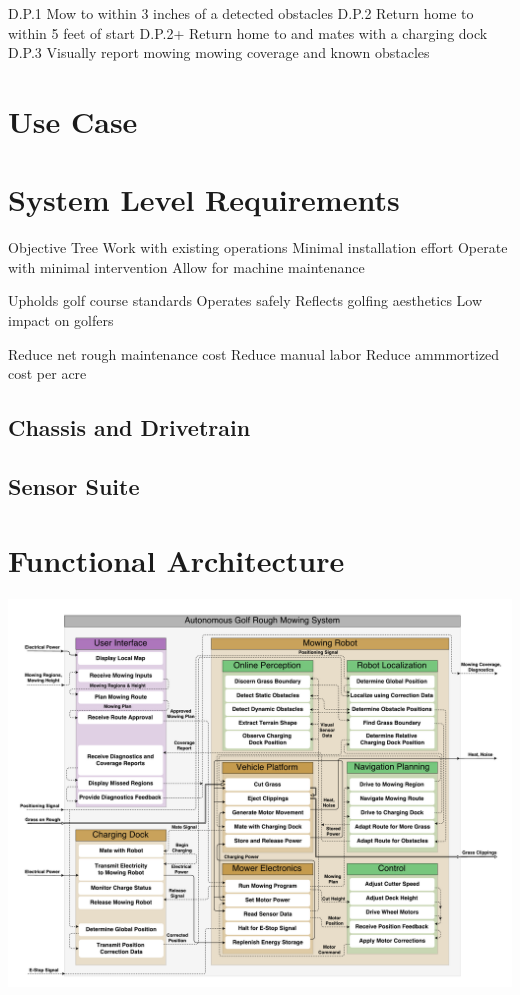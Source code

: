 \documentclass{article}
\begin{document}
D.P.1 Mow to within 3 inches of a detected obstacles
D.P.2 Return home to within 5 feet of start
D.P.2+ Return home to and mates with a charging dock
D.P.3 Visually report mowing mowing coverage and known obstacles

\section{Use Case}

\section{System Level Requirements}
Objective Tree
Work with existing operations
  Minimal installation effort
  Operate with minimal intervention
  Allow for machine maintenance

Upholds golf course standards
  Operates safely 
  Reflects golfing aesthetics
  Low impact on golfers
  
Reduce net rough maintenance cost
  Reduce manual labor
  Reduce ammmortized cost per acre
  
\subsection{Chassis and Drivetrain}
\subsection{Sensor Suite}

\section{Functional Architecture}
\includegraphics[scale=0.3]{functional}
\end{document}
